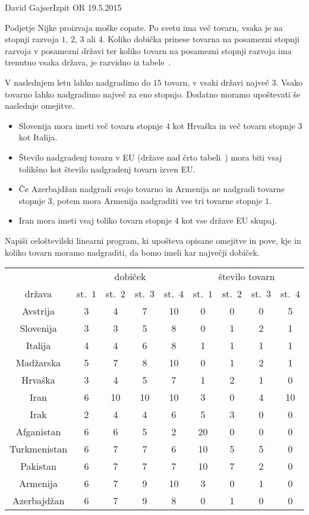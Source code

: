 \begin{naloga}{David Gajser}{Izpit OR 19.5.2015}
\begin{vprasanje}
Podjetje Nijke proizvaja moške copate.
Po svetu ima več tovarn,
vsaka je na stopnji razvoja $1$, $2$, $3$ ali $4$.
Koliko dobička prinese
tovarna na posamezni stopnji razvoja v posamezni državi
ter koliko tovarn na posamezni stopnji razvoja ima trenutno vsaka država,
je razvidno iz tabele~\tab.

V naslednjem letu lahko nadgradimo do $15$ tovarn,
v vsaki državi največ $3$.
Vsako tovarno lahko nadgradimo največ za eno stopnjo.
Dodatno moramo upoštevati še naslednje omejitve.
\begin{itemize}
\item Slovenija mora imeti več tovarn stopnje $4$ kot Hrvaška
in več tovarn stopnje $3$ kot Italija.
\item Število nadgradenj tovarn v EU (države nad črto tabeli~\tab)
mora biti vsaj tolikšno kot število nadgradenj tovarn izven EU.
\item Če Azerbajdžan nadgradi svojo tovarno
in Armenija ne nadgradi tovarne stopnje $3$,
potem mora Armenija nadgraditi vse tri tovarne stopnje $1$.
\item Iran mora imeti vsaj toliko tovarn stopnje $4$
kot vse države EU skupaj.
\end{itemize}

Napiši celoštevilski linearni program,
ki upošteva opisane omejitve in pove,
kje in koliko tovarn moramo nadgraditi, da bomo imeli kar največji dobiček.

\begin{tabela}
\begin{tabular}{c|cccc|cccc}
& \multicolumn{4}{|c|}{dobiček}
& \multicolumn{4}{c}{število tovarn} \\
država & st.~$1$ & st.~$2$ & st.~$3$ & st.~$4$
& st.~$1$ & st.~$2$ & st.~$3$ & st.~$4$ \\ \hline
Avstrija     & 3 &  4 &  7 & 10 &  0 & 0 & 0 &  5 \\
Slovenija    & 3 &  3 &  5 &  8 &  0 & 1 & 2 &  1 \\
Italija      & 4 &  4 &  6 &  8 &  1 & 1 & 1 &  1 \\
Madžarska    & 5 &  7 &  8 & 10 &  0 & 1 & 2 &  1 \\
Hrvaška      & 3 &  4 &  5 &  7 &  1 & 2 & 1 &  0 \\ \hline
Iran         & 6 & 10 & 10 & 10 &  3 & 0 & 4 & 10 \\
Irak         & 2 &  4 &  4 &  6 &  5 & 3 & 0 &  0 \\
Afganistan   & 6 &  6 &  5 &  2 & 20 & 0 & 0 &  0 \\
Turkmenistan & 6 &  7 &  7 &  6 & 10 & 5 & 5 &  0 \\
Pakistan     & 6 &  7 &  7 &  7 & 10 & 7 & 2 &  0 \\
Armenija     & 6 &  7 &  9 & 10 &  3 & 0 & 1 &  0 \\
Azerbajdžan  & 6 &  7 &  9 &  8 &  0 & 1 & 0 &  0 \\
\end{tabular}
\end{tabela}
\end{vprasanje}


\end{naloga}

